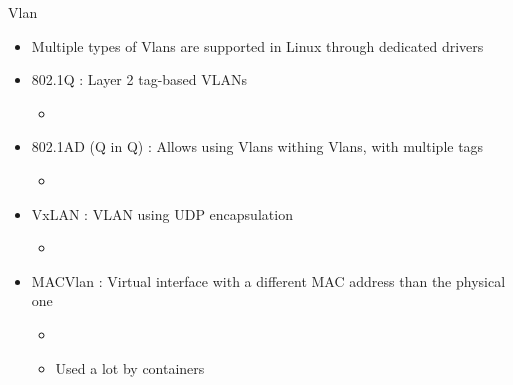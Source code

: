 \begin{frame}{Vlan}
	\begin{itemize}
		\item Multiple types of Vlans are supported in Linux through dedicated drivers
		\item 802.1Q : Layer 2 tag-based VLANs
			\begin{itemize}
				\item {}
			\end{itemize}
		\item 802.1AD (Q in Q) : Allows using Vlans withing Vlans, with multiple tags
			\begin{itemize}
				\item {}
			\end{itemize}
		\item VxLAN : VLAN using UDP encapsulation
			\begin{itemize}
				\item {}
			\end{itemize}
		\item MACVlan : Virtual interface with a different MAC address than the physical one
			\begin{itemize}
				\item {}
				\item Used a lot by containers
			\end{itemize}
	\end{itemize}
\end{frame}

